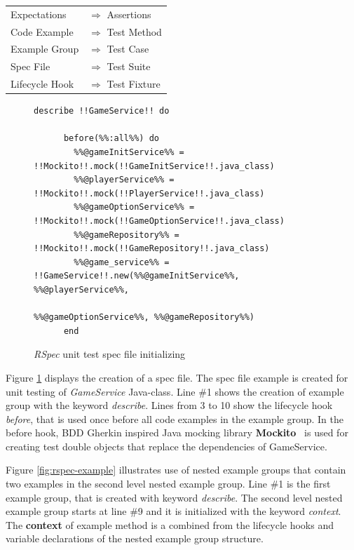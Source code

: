     \begin{longtable}{@{}p{}p{}@{}}
    Expectations & $\Longrightarrow$  \textrm{Assertions} \\
    Code Example & $\Longrightarrow$  \textrm{Test Method} \\
    Example Group & $\Longrightarrow$  \textrm{Test Case} \\
    Spec File & $\Longrightarrow$  \textrm{Test Suite} \\
    Lifecycle Hook & $\Longrightarrow$  \textrm{Test Fixture} \\
    \end{longtable}

    \begin{figure}[H]
        \begin{lstlisting}[style=ruby]
    describe !!GameService!! do

      before(%%:all%%) do
        %%@gameInitService%% = !!Mockito!!.mock(!!GameInitService!!.java_class)
        %%@playerService%% = !!Mockito!!.mock(!!PlayerService!!.java_class)
        %%@gameOptionService%% = !!Mockito!!.mock(!!GameOptionService!!.java_class)
        %%@gameRepository%% = !!Mockito!!.mock(!!GameRepository!!.java_class)
        %%@game_service%% = !!GameService!!.new(%%@gameInitService%%, %%@playerService%%,
                                           %%@gameOptionService%%, %%@gameRepository%%)
      end
        \end{lstlisting}
        \caption{\textit{RSpec} unit test spec file initializing}
        \label{fig:rspec-init}
    \end{figure}

    Figure \ref{fig:rspec-init} displays the creation of a spec file. The spec file example is created for unit testing
    of \textit{GameService} Java-class. Line \#1 shows the creation of example group with the keyword \textit{describe}. Lines from
    3 to 10 show the lifecycle hook \textit{before}, that is used once before all code examples in the example group.
    In the before hook, BDD Gherkin inspired Java mocking library \textbf{Mockito}~\cite{mockito} is used for
    creating test double objects that replace the dependencies of GameService.

    Figure \ref{fig:rspec-example} illustrates use of nested example groups that contain two examples in the second
    level nested example group. Line \#1 is the first example group, that is created with keyword \textit{describe}. The second
    level nested example group starts at line \#9 and it is initialized with the keyword \textit{context}. The \textbf{context} of
    example method is a combined from the lifecycle hooks and variable declarations of the nested example group structure.

